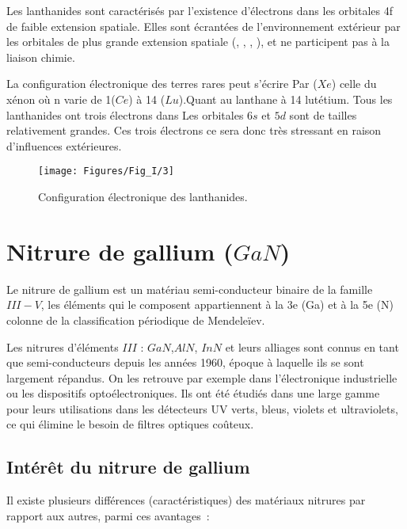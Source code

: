 Les lanthanides sont caractérisés par l’existence d’électrons dans les orbitales 4f de faible extension spatiale. Elles sont écrantées de l’environnement extérieur par les orbitales de plus grande extension spatiale (, , , ), et ne participent pas à la liaison chimie.

La configuration électronique des terres rares peut s'écrire Par ($ Xe $) celle du xénon où n varie de 1($ Ce $) à 14 ($ Lu $).Quant au lanthane à 14 lutétium. Tous les lanthanides ont trois électrons dans Les orbitales $ 6s $ et $ 5d $ sont de tailles relativement grandes. Ces trois électrons ce sera donc très stressant en raison d'influences extérieures.

\begin{figure}[h!]
	\centering
	\texttt{[image: Figures/Fig\_I/3]}
	\caption{Configuration électronique des lanthanides.}
	\label{fig:3}
\end{figure}
\FloatBarrier

\section{Nitrure de gallium ($ GaN $)}
Le nitrure de gallium est un matériau semi-conducteur binaire de la famille$  III-V $, les éléments qui le composent appartiennent à la 3e (Ga) et à la 5e (N) colonne de la classification périodique de Mendeleïev.

Les nitrures d’éléments $ III $ : $ GaN $,$  AlN $, $ InN $ et leurs alliages sont connus en tant que semi-conducteurs depuis les années 1960, époque à laquelle ils se sont largement répandus. On les retrouve par exemple dans l'électronique industrielle ou les dispositifs optoélectroniques. Ils ont été étudiés dans une large gamme pour leurs utilisations dans les détecteurs UV verts, bleus, violets et ultraviolets, ce qui élimine le besoin de filtres optiques coûteux\cite{a2}.

\subsection{Intérêt du nitrure de gallium}
Il existe plusieurs différences (caractéristiques) des matériaux nitrures par rapport aux autres, parmi ces avantages :

